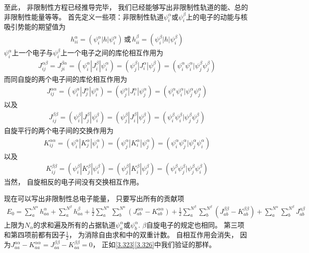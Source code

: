 至此，
非限制性\hft 方程已经推导完毕，
我们已经能够写出非限制性轨道的能、总的非限制性能量等等。
首先定义一些项：非限制性轨道$\psi_i^\alpha$或$\psi_i^\beta$上的电子的动能与核吸引势能的期望值为
\begin{align}\label{3.321}
	h_{ii}^\alpha = (\psi_i^\alpha|h|\psi_i^\alpha)\, \text{或}\, h_{ii}^\beta = (\psi_i^\beta|h|\psi_i^\beta)
\end{align}
$\psi_i^\alpha$上一个电子与$\psi_i^\beta$上一个电子之间的库伦相互作用为
\begin{align}\label{3.322}
	J_{ij}^{\alpha\beta} = J_{ji}^{\beta\alpha} = (\psi_i^\alpha|J_{i}^\beta|\psi_i^\alpha) = (\psi_j^\beta|J_{i}^\alpha|\psi_j^\beta) = (\psi_i^\alpha\psi_i^\alpha|\psi_j^\beta\psi_j^\beta)
\end{align}
而同自旋的两个电子间的库伦相互作用为
\begin{align}\label{3.323}
	J_{i j}^{\alpha \alpha}=(\psi_{i}^{\alpha}|J_{j}^{\alpha}| \psi_{i}^{\alpha})=(\psi_{j}^{\alpha}|J_{i}^{\alpha}| \psi_{j}^{\alpha})=(\psi_{i}^{\alpha} \psi_{i}^{\alpha} | \psi_{j}^{\alpha} \psi_{j}^{\alpha})
\end{align}
以及
\begin{align}\label{3.324}
	J_{i j}^{\beta \beta}=(\psi_{i}^{\beta}|J_{j}^{\beta}| \psi_{i}^{\beta})=(\psi_{j}^{\beta}|J_{i}^{\beta}| \psi_{j}^{\beta})=(\psi_{i}^{\beta} \psi_{i}^{\beta} | \psi_{j}^{\beta} \psi_{j}^{\beta})
\end{align}
自旋平行的两个电子间的交换作用为
\begin{align}\label{3.325}
	K_{i j}^{\alpha\alpha}=(\psi_{i}^{\alpha}|K_{j}^{\alpha}| \psi_{i}^{\alpha})=(\psi_{j}^{\alpha}|K_{i}^{\alpha}| \psi_{j}^{\alpha})=(\psi_{i}^{\alpha} \psi_{j}^{\alpha} | \psi_{j}^{\alpha} \psi_{i}^{\alpha})
\end{align}
以及
\begin{align}\label{3.326}
	K_{i j}^{\beta\beta}=(\psi_{i}^{\beta}|K_{j}^{\beta}| \psi_{i}^{\beta})=(\psi_{j}^{\beta}|K_{i}^{\beta}| \psi_{j}^{\beta})=(\psi_{i}^{\beta} \psi_{j}^{\beta} | \psi_{j}^{\beta} \psi_{i}^{\beta})
\end{align}
当然，
自旋相反的电子间没有交换相互作用。


现在可以写出非限制性总电子能量，
只要写出所有的贡献项
\begin{align}
	\label{3.327}
	E_{0}=\sum_{a}^{N^{\alpha}} h_{a a}^{\alpha}+\sum_{a}^{N^{\beta}} h_{a a}^{\beta}+\frac{1}{2} \sum_{a}^{N^{\alpha}} \sum_{b}^{N^{\alpha}}\left(J_{a b}^{\alpha \alpha}-K_{a b}^{\alpha \alpha}\right)+\frac{1}{2} \sum_{a}^{N^{\beta}} \sum_{b}^{N^{\beta}}\left(J_{a b}^{\beta \beta}-K_{a b}^{\beta \beta}\right)+\sum_{a}^{N^{\alpha}} \sum_{b}^{N^{\beta}} J_{a b}^{a \beta}
\end{align}
上限为$N_\alpha$的求和遍及所有的占据轨道$\psi_a^\alpha$或$\psi_b^\alpha$. 
$\beta$自旋电子的规定也相同。 
第三项和第四项前都有因子$\frac{1}{2}$，
为消除自由求和中的双重计数。
自相互作用会消失，
因为$J_{a a}^{a \alpha}-K_{a a}^{\alpha \alpha}=J_{a a}^{\beta \beta}-K_{a a}^{\beta \beta}=0$，
正如\autoref{3.323}\autoref{3.326}中我们验证的那样。

